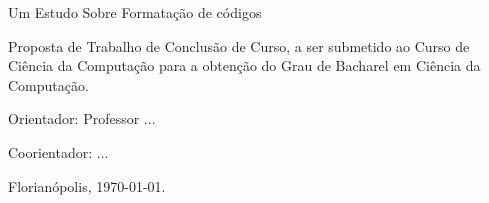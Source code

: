


\begin{titlepage}

    \center




    \Author



    \bigskip
    Um Estudo Sobre Formatação de códigos\\[3cm]

    \begin{flushright}

        \begin{minipage}{0.518\textwidth}

            Proposta de Trabalho de Conclusão de Curso,
            a ser submetido ao Curso de Ciência da Computação
            para a obtenção do Grau de Bacharel em Ciência da Computação.

            \medskip
            Orientador: Professor ...

            \medskip
            Coorientador: ...

        \end{minipage}

    \end{flushright}


    Florianópolis, \today.

\end{titlepage}






